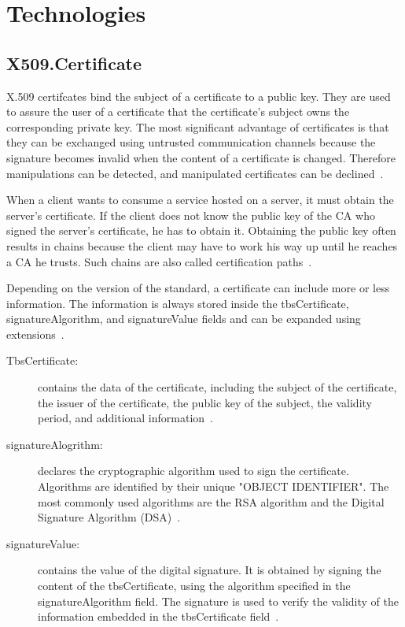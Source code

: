 
\section{Technologies}
\subsection{X509.Certificate}
X.509 certifcates bind the subject of a certificate to a public key.
They are used to assure the user of a certificate that the certificate's subject owns the corresponding private key.
The most significant advantage of certificates is that they can be exchanged using untrusted communication channels because the signature becomes invalid when the content of a certificate is changed.
Therefore manipulations can be detected, and manipulated certificates can be declined~\cite{x509rfc}.

When a client wants to consume a service hosted on a server, it must obtain the server's certificate.
If the client does not know the public key of the CA who signed the server's certificate, he has to obtain it.
Obtaining the public key often results in chains because the client may have to work his way up until he reaches a CA he trusts.
Such chains are also called certification paths~\cite{x509rfc}.

Depending on the version of the standard, a certificate can include more or less information.
The information is always stored inside the tbsCertificate, signatureAlgorithm, and signatureValue fields and can be expanded using extensions~\cite{x509rfc}.
\begin{description}
	\item[TbsCertificate:] contains the data of the certificate, including the subject of the certificate, the issuer of the certificate, the public key of the subject, the validity period, and additional information~\cite{x509rfc}.
	\item[signatureAlogrithm:] declares the cryptographic algorithm used to sign the certificate.
		Algorithms are identified by their unique "OBJECT IDENTIFIER".
		The most commonly used algorithms are the RSA algorithm and the Digital Signature Algorithm (DSA)~\cite{x509rfc}.
	\item[signatureValue:] contains the value of the digital signature.
		It is obtained by signing the content of the tbsCertificate, using the algorithm specified in the signatureAlgorithm field.
		The signature is used to verify the validity of the information embedded in the tbsCertificate field~\cite{x509rfc}.
\end{description}

